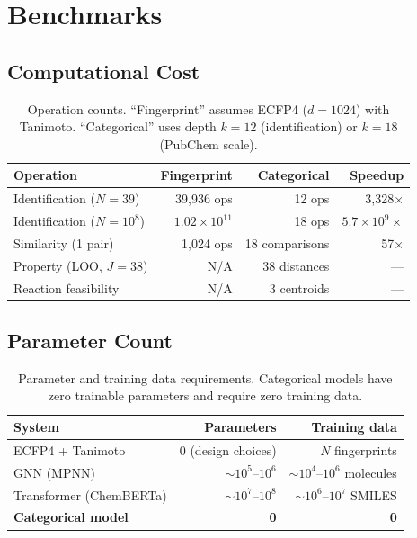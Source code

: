 \documentclass[11pt,twocolumn,a4paper]{article}
\theoremstyle{definition}
\theoremstyle{remark}
\begin{document}
\section{Benchmarks}
\label{sec:benchmarks}

\subsection{Computational Cost}

\begin{table}[h]
\centering
\small
\begin{tabular}{lrrr}
\toprule
\textbf{Operation} & \textbf{Fingerprint} & \textbf{Categorical} & \textbf{Speedup} \\
\midrule
Identification ($N=39$) & 39{,}936 ops & 12 ops & 3{,}328$\times$ \\
Identification ($N=10^8$) & $1.02 \times 10^{11}$ & 18 ops & $5.7 \times 10^9\times$ \\
Similarity (1 pair) & 1{,}024 ops & 18 comparisons & 57$\times$ \\
Property (LOO, $J=38$) & N/A & 38 distances & --- \\
Reaction feasibility & N/A & 3 centroids & --- \\
\bottomrule
\end{tabular}
\caption{Operation counts. ``Fingerprint'' assumes ECFP4 ($d = 1024$) with Tanimoto. ``Categorical'' uses depth $k = 12$ (identification) or $k = 18$ (PubChem scale).}
\label{tab:benchmarks}
\end{table}

\subsection{Parameter Count}

\begin{table}[h]
\centering
\small
\begin{tabular}{lrr}
\toprule
\textbf{System} & \textbf{Parameters} & \textbf{Training data} \\
\midrule
ECFP4 + Tanimoto & 0 (design choices) & $N$ fingerprints \\
GNN (MPNN) & $\sim 10^5$--$10^6$ & $\sim 10^4$--$10^6$ molecules \\
Transformer (ChemBERTa) & $\sim 10^7$--$10^8$ & $\sim 10^6$--$10^7$ SMILES \\
\textbf{Categorical model} & \textbf{0} & \textbf{0} \\
\bottomrule
\end{tabular}
\caption{Parameter and training data requirements. Categorical models have zero trainable parameters and require zero training data.}
\label{tab:parameters}
\end{table}
\end{document}
